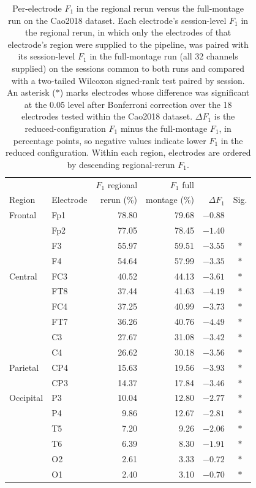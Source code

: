\documentclass[journal,twoside,web]{ieeecolor}
\begin{document}
\begin{table}[htbp]
  \centering
  \renewcommand{\baselinestretch}{1}\normalsize
  \caption{Per-electrode $F_1$ in the regional rerun versus the full-montage run on the Cao2018 dataset. Each electrode's session-level $F_1$ in the regional rerun, in which only the electrodes of that electrode's region were supplied to the pipeline, was paired with its session-level $F_1$ in the full-montage run (all 32 channels supplied) on the sessions common to both runs and compared with a two-tailed Wilcoxon signed-rank test paired by session. An asterisk ($*$) marks electrodes whose difference was significant at the 0.05 level after Bonferroni correction over the 18 electrodes tested within the Cao2018 dataset. $\Delta F_1$ is the reduced-configuration $F_1$ minus the full-montage $F_1$, in percentage points, so negative values indicate lower $F_1$ in the reduced configuration. Within each region, electrodes are ordered by descending regional-rerun $F_1$.}
  \label{tab:app_regional_cao2018}
  \footnotesize
  \setlength{\tabcolsep}{2.5pt}
  \begin{tabular}{@{}llrrrc@{}}
    \toprule
     &  & $F_1$ regional & $F_1$ full &  & \\
    Region & Electrode & rerun (\%) & montage (\%) & $\Delta F_1$ & Sig. \\
    \midrule
    Frontal & Fp1 & 78.80 & 79.68 & $-0.88$ & \\
     & Fp2 & 77.05 & 78.45 & $-1.40$ & \\
     & F3 & 55.97 & 59.51 & $-3.55$ & $*$ \\
     & F4 & 54.64 & 57.99 & $-3.35$ & $*$ \\
    \addlinespace
    Central & FC3 & 40.52 & 44.13 & $-3.61$ & $*$ \\
     & FT8 & 37.44 & 41.63 & $-4.19$ & $*$ \\
     & FC4 & 37.25 & 40.99 & $-3.73$ & $*$ \\
     & FT7 & 36.26 & 40.76 & $-4.49$ & $*$ \\
     & C3 & 27.67 & 31.08 & $-3.42$ & $*$ \\
     & C4 & 26.62 & 30.18 & $-3.56$ & $*$ \\
    \addlinespace
    Parietal & CP4 & 15.63 & 19.56 & $-3.93$ & $*$ \\
     & CP3 & 14.37 & 17.84 & $-3.46$ & $*$ \\
    \addlinespace
    Occipital & P3 & 10.04 & 12.80 & $-2.77$ & $*$ \\
     & P4 & 9.86 & 12.67 & $-2.81$ & $*$ \\
     & T5 & 7.20 & 9.26 & $-2.06$ & $*$ \\
     & T6 & 6.39 & 8.30 & $-1.91$ & $*$ \\
     & O2 & 2.61 & 3.33 & $-0.72$ & $*$ \\
     & O1 & 2.40 & 3.10 & $-0.70$ & $*$ \\
    \bottomrule
  \end{tabular}
\end{table}
\end{document}
